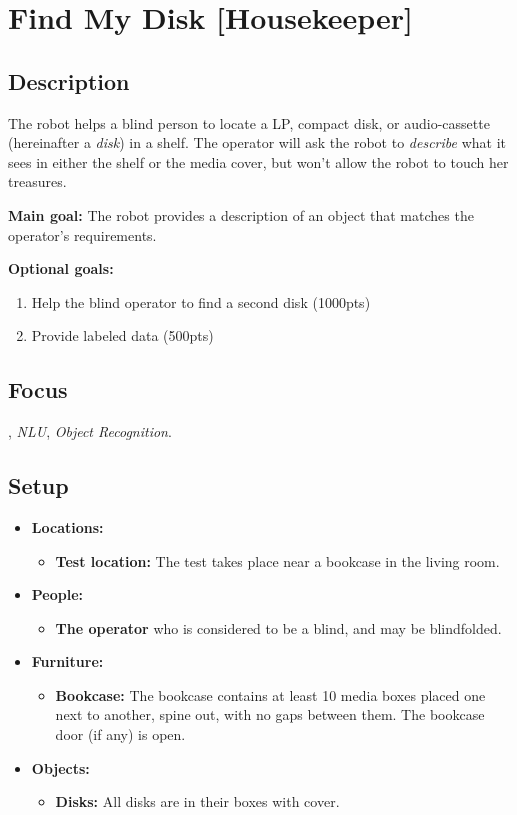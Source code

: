 \section{Find My Disk [Housekeeper]}
\label{test:find-my-disk}

\subsection*{Description}
   The robot helps a blind person to locate a LP, compact disk, or audio-cassette (hereinafter a \textit{disk}) in a shelf. The operator will ask the robot to \emph{describe} what it sees in either the shelf or the media cover, but won't allow the robot to touch her treasures.

\textbf{Main goal:}
   The robot provides a description of an object that matches the operator's requirements.

\textbf{Optional goals:}
\begin{enumerate}[nosep]
	\item Help the blind operator to find a second disk (1000pts)
	\item Provide labeled data (500pts)
\end{enumerate}

\subsection*{Focus}
\HRI{}, \textit{NLU}, \textit{Object Recognition}.


%
%
\subsection*{Setup}
\begin{itemize}[nosep]
	\item \textbf{Locations:}
		\begin{itemize}
			\item \textbf{Test location:} The test takes place near a bookcase in the living room.
		\end{itemize}
	\item \textbf{People:}
		\begin{itemize}
			\item \textbf{The operator} who is considered to be a blind, and may be blindfolded.
		\end{itemize}
	\item \textbf{Furniture:}
		\begin{itemize}
			\item \textbf{Bookcase:} The bookcase contains at least 10 media boxes placed one next to another, spine out, with no gaps between them. The bookcase door (if any) is open.
		\end{itemize}
	\item \textbf{Objects:}
		\begin{itemize}
			\item \textbf{Disks:} All disks are in their boxes with cover.
		\end{itemize}
\end{itemize}

